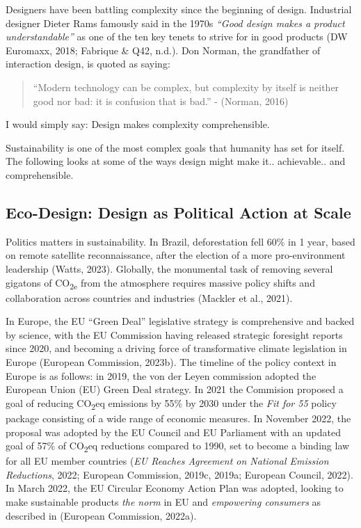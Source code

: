 \documentclass[
  12pt,
  letterpaper,
  DIV=11,
  numbers=noendperiod]{scrartcl}
\begin{document}
Designers have been battling complexity since the beginning of design.
Industrial designer Dieter Rams famously said in the 1970s \emph{``Good
design makes a product understandable''} as one of the ten key tenets to
strive for in good products (DW Euromaxx, 2018; Fabrique \& Q42, n.d.).
Don Norman, the grandfather of interaction design, is quoted as saying:

\begin{quote}
``Modern technology can be complex, but complexity by itself is neither
good nor bad: it is confusion that is bad.'' - (Norman, 2016)
\end{quote}

I would simply say: Design makes complexity comprehensible.

Sustainability is one of the most complex goals that humanity has set
for itself. The following looks at some of the ways design might make
it.. achievable.. and comprehensible.

\subsection{Eco-Design: Design as Political Action at
Scale}\label{eco-design-design-as-political-action-at-scale}

Politics matters in sustainability. In Brazil, deforestation fell 60\%
in 1 year, based on remote satellite reconnaissance, after the election
of a more pro-environment leadership (Watts, 2023). Globally, the
monumental task of removing several gigatons of CO\textsubscript{2e}
from the atmosphere requires massive policy shifts and collaboration
across countries and industries (Mackler et al., 2021).

In Europe, the EU ``Green Deal'' legislative strategy is comprehensive
and backed by science, with the EU Commission having released strategic
foresight reports since 2020, and becoming a driving force of
transformative climate legislation in Europe (European Commission,
2023b). The timeline of the policy context in Europe is as follows: in
2019, the von der Leyen commission adopted the European Union (EU) Green
Deal strategy. In 2021 the Commision proposed a goal of reducing
CO\textsubscript{2}eq emissions by 55\% by 2030 under the \emph{Fit for
55} policy package consisting of a wide range of economic measures. In
November 2022, the proposal was adopted by the EU Council and EU
Parliament with an updated goal of 57\% of CO\textsubscript{2}eq
reductions compared to 1990, set to become a binding law for all EU
member countries (\emph{{EU} Reaches Agreement on National Emission
Reductions}, 2022; European Commission, 2019c, 2019a; European Council,
2022). In March 2022, the EU Circular Economy Action Plan was adopted,
looking to make sustainable products \emph{the norm} in EU and
\emph{empowering consumers} as described in (European Commission,
2022a).
\end{document}
